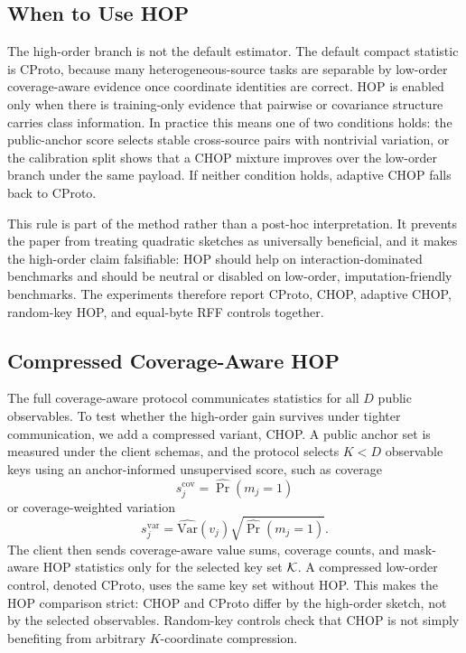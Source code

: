 \subsection{When to Use HOP}

The high-order branch is not the default estimator. The default compact statistic is CProto, because many heterogeneous-source tasks are separable by low-order coverage-aware evidence once coordinate identities are correct. HOP is enabled only when there is training-only evidence that pairwise or covariance structure carries class information. In practice this means one of two conditions holds: the public-anchor score selects stable cross-source pairs with nontrivial variation, or the calibration split shows that a CHOP mixture improves over the low-order branch under the same payload. If neither condition holds, adaptive CHOP falls back to CProto.

This rule is part of the method rather than a post-hoc interpretation. It prevents the paper from treating quadratic sketches as universally beneficial, and it makes the high-order claim falsifiable: HOP should help on interaction-dominated benchmarks and should be neutral or disabled on low-order, imputation-friendly benchmarks. The experiments therefore report CProto, CHOP, adaptive CHOP, random-key HOP, and equal-byte RFF controls together.

\subsection{Compressed Coverage-Aware HOP}

The full coverage-aware protocol communicates statistics for all \(D\) public observables. To test whether the high-order gain survives under tighter communication, we add a compressed variant, CHOP. A public anchor set is measured under the client schemas, and the protocol selects \(K<D\) observable keys using an anchor-informed unsupervised score, such as coverage
\begin{equation}
    s^{\mathrm{cov}}_j = \widehat{\Pr}(m_j=1)
\end{equation}
or coverage-weighted variation
\begin{equation}
    s^{\mathrm{var}}_j =
    \widehat{\mathrm{Var}}(v_j)\sqrt{\widehat{\Pr}(m_j=1)}.
\end{equation}
The client then sends coverage-aware value sums, coverage counts, and mask-aware HOP statistics only for the selected key set \(\mathcal{K}\). A compressed low-order control, denoted CProto, uses the same key set without HOP. This makes the HOP comparison strict: CHOP and CProto differ by the high-order sketch, not by the selected observables. Random-key controls check that CHOP is not simply benefiting from arbitrary \(K\)-coordinate compression.

